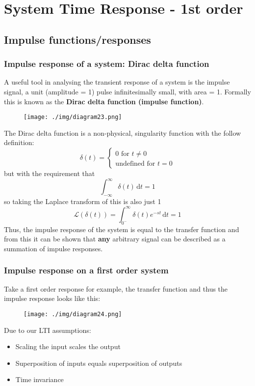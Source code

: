 \chapter{System Time Response - 1st order}
\section{Impulse functions/responses}
\subsection{Impulse response of a system: Dirac delta function}
A useful tool in analysing the transient response of a system is the impulse signal, a unit (amplitude = 1) pulse infinitesimally small, with area = 1. Formally this is known as the \textbf{Dirac delta function (impulse function)}.
\begin{figure}[H]
  \centering
  \texttt{[image: ./img/diagram23.png]}
\end{figure}
The Dirac delta function is a non-physical, singularity function with the follow definition:
\begin{equation}
  \delta (t) = \begin{cases}
    0 \textrm{ for } t \neq 0 \\
    \textrm{undefined for } t = 0
  \end{cases}
\end{equation}
but with the requirement that
\begin{equation}
  \int_{-\infty}^{\infty} \delta (t) \,\mathrm{d}t =1
\end{equation}
so taking the Laplace transform of this is also just 1
\begin{equation}
  \mathcal{L} (\delta (t)) = \int_{0^-}^{\infty} \delta (t) e^{-st} \,\mathrm{d}t = 1
\end{equation}
Thus, the impulse response of the system is equal to the transfer function and from this it can be shown that \textbf{any} arbitrary signal can be described as a summation of impulse responses.
\subsection{Impulse response on a first order system}
Take a first order response for example, the transfer function and thus the impulse response looks like this:
\begin{figure}[H]
  \centering
  \texttt{[image: ./img/diagram24.png]}
\end{figure}
Due to our LTI assumptions:
\begin{itemize}
  \item Scaling the input scales the output
  \item Superposition of inputs equals superposition of outputs
  \item Time invariance
\end{itemize}
